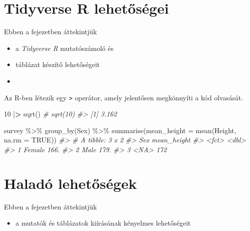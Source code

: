 \documentclass[
]{book}
\makeatletter
\newenvironment{Shaded}{\begin{snugshade}}{\end{snugshade}}
\newcommand{\AttributeTok}[1]{\textcolor[rgb]{0.77,0.63,0.00}{#1}}
\newcommand{\CommentTok}[1]{\textcolor[rgb]{0.56,0.35,0.01}{\textit{#1}}}
\newcommand{\ConstantTok}[1]{\textcolor[rgb]{0.00,0.00,0.00}{#1}}
\newcommand{\DecValTok}[1]{\textcolor[rgb]{0.00,0.00,0.81}{#1}}
\newcommand{\ErrorTok}[1]{\textcolor[rgb]{0.64,0.00,0.00}{\textbf{#1}}}
\newcommand{\FunctionTok}[1]{\textcolor[rgb]{0.00,0.00,0.00}{#1}}
\newcommand{\NormalTok}[1]{#1}
\newcommand{\SpecialCharTok}[1]{\textcolor[rgb]{0.00,0.00,0.00}{#1}}
\providecommand{\tightlist}{%
  \setlength{\itemsep}{0pt}\setlength{\parskip}{0pt}}
\newenvironment{kframe}{%
\medskip{}
\setlength{\fboxsep}{.8em}
 \def\at@end@of@kframe{}%
 \ifinner\ifhmode%
  \def\at@end@of@kframe{\end{minipage}}%
  \begin{minipage}{\columnwidth}%
 \fi\fi%
 \def\FrameCommand##1{\hskip\@totalleftmargin \hskip-\fboxsep
 \colorbox{shadecolor}{##1}\hskip-\fboxsep
     \hskip-\linewidth \hskip-\@totalleftmargin \hskip\columnwidth}%
 \MakeFramed {\advance\hsize-\width
   \@totalleftmargin\z@ \linewidth\hsize
   \@setminipage}}%
 {\par\unskip\endMakeFramed%
 \at@end@of@kframe}
\newenvironment{rmdblock}[1]
  {
  \begin{itemize}
  \renewcommand{\labelitemi}{
    \raisebox{-.7\height}[0pt][0pt]{
      {\setkeys{Gin}{width=3em,keepaspectratio}\texttt{[image: images/\#1]}}
    }
  }
  \setlength{\fboxsep}{1em}
  \begin{kframe}
  \item
  }
  {
  \end{kframe}
  \end{itemize}
  }
\newenvironment{rmdlevel2}
  {\begin{rmdblock}{level2}}
  {\end{rmdblock}}
\newenvironment{rmdlevel3}
  {\begin{rmdblock}{level3}}
  {\end{rmdblock}}
\makeatother
\begin{document}
\hypertarget{tidyverse-r-lehetux151suxe9gei}{%
\section{Tidyverse R lehetőségei}\label{tidyverse-r-lehetux151suxe9gei}}

\begin{rmdlevel2}
Ebben a fejezetben áttekintjük

\begin{itemize}
\tightlist
\item
  a \emph{Tidyverse R} mutatószámoló és
\item
  táblázat készítő lehetőségeit
\item
\end{itemize}
\end{rmdlevel2}

Az R-ben létezik egy \texttt{\textbar{}\textgreater{}} operátor, amely jelentősen megkönnyíti a kód olvasását.

\begin{Shaded}
\begin{Highlighting}[]
\DecValTok{10} \SpecialCharTok{|}\ErrorTok{\textgreater{}} \FunctionTok{sqrt}\NormalTok{()  }\CommentTok{\# sqrt(10)}
\CommentTok{\#\textgreater{} [1] 3.162}

\NormalTok{survey }\SpecialCharTok{\%\textgreater{}\%}
  \FunctionTok{group\_by}\NormalTok{(Sex) }\SpecialCharTok{\%\textgreater{}\%}
  \FunctionTok{summarise}\NormalTok{(}\AttributeTok{mean\_height =} \FunctionTok{mean}\NormalTok{(Height, }\AttributeTok{na.rm =} \ConstantTok{TRUE}\NormalTok{))}
\CommentTok{\#\textgreater{} \# A tibble: 3 x 2}
\CommentTok{\#\textgreater{}   Sex    mean\_height}
\CommentTok{\#\textgreater{}   \textless{}fct\textgreater{}        \textless{}dbl\textgreater{}}
\CommentTok{\#\textgreater{} 1 Female        166.}
\CommentTok{\#\textgreater{} 2 Male          179.}
\CommentTok{\#\textgreater{} 3 \textless{}NA\textgreater{}          172}
\end{Highlighting}
\end{Shaded}

\hypertarget{haladuxf3-lehetux151suxe9gek}{%
\section{Haladó lehetőségek}\label{haladuxf3-lehetux151suxe9gek}}

\begin{rmdlevel3}
Ebben a fejezetben áttekintjük

\begin{itemize}
\tightlist
\item
  a mutatók és táblázatok kiírásának kényelmes lehetőségeit
\end{itemize}
\end{rmdlevel3}
\end{document}
